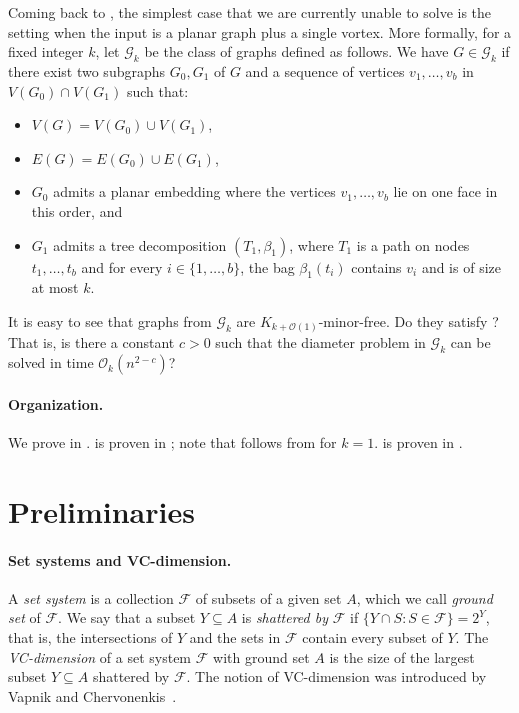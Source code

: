 \documentclass[11pt,a4paper]{article}
\newcommand{\Oh}{\mathcal{O}}
\begin{document}
Coming back to ,
the simplest case
that we are currently unable to solve is the setting when the input is a planar graph plus a single vortex. More formally, for a fixed integer $k$, let $\mathcal{G}_k$ be the class of graphs
defined as follows. We have $G \in \mathcal{G}_k$ if there exist two subgraphs $G_0,G_1$
of $G$ and a sequence of vertices $v_1,\ldots,v_b$ in $V(G_0) \cap V(G_1)$
such that:
\begin{itemize}[nosep]
 \item $V(G) = V(G_0) \cup V(G_1)$,
 \item $E(G) = E(G_0) \cup E(G_1)$,
 \item $G_0$ admits a planar embedding where the vertices $v_1,\ldots,v_b$ lie on one face in
this order, and
\item $G_1$ admits a tree decomposition $(T_1,\beta_1)$, where $T_1$ is a path on nodes $t_1,\ldots,t_b$ and for every $i\in\{1,\ldots,b\}$, the bag $\beta_1(t_i)$ contains $v_i$
and is of size at most $k$.
\end{itemize}
It is easy to see that graphs from $\mathcal{G}_k$ are $K_{k+\Oh(1)}$-minor-free.
Do they satisfy ? That is, is there a constant
$c > 0$ such that the diameter problem in $\mathcal{G}_k$ can be solved in
time $\Oh_k(n^{2-c})$?

\paragraph{Organization.}
We prove  in .
 is proven in ; note that  follows from 
for $k=1$. 
 is proven in .

 
\section{Preliminaries}\label{sec:prelims}

\paragraph{Set systems and VC-dimension.}
A \emph{set system} is a collection $\mathcal{F}$ of subsets of a given set $A$, which we call \emph{ground set} of $\mathcal{F}$.
We say that a subset $Y\subseteq A$ is \emph{shattered by} $\mathcal{F}$
if $\{Y \cap S : S \in \mathcal{F}\} = 2^Y$, that is, the intersections of $Y$ and the sets in $\mathcal{F}$ contain every subset of $Y$.
The \emph{VC-dimension} of a set system $\mathcal{F}$ with ground set $A$
is the size of the largest subset $Y\subseteq A$ shattered by $\mathcal{F}$. The notion of VC-dimension was introduced by Vapnik and Chervonenkis~\cite{VapnikC71}.
\end{document}
